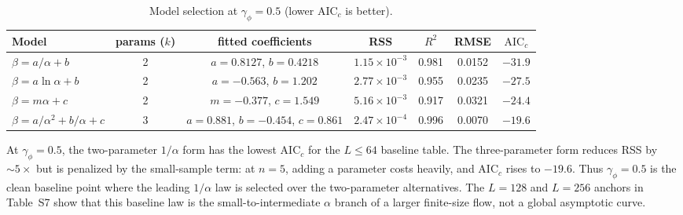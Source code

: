 \documentclass[aps,prb,twocolumn,superscriptaddress]{revtex4-2}
\begin{document}
\begin{table}[h]
\caption{Model selection at $\gamma_\phi = 0.5$ (lower $\text{AIC}_c$ is better).}
\label{tab:S1}
\begin{ruledtabular}
\begin{tabular}{lcccccc}
Model & params ($k$) & fitted coefficients & RSS & $R^2$ & RMSE & $\text{AIC}_c$ \\
\hline
$\beta = a/\alpha + b$ & 2 & $a=0.8127$, $b=0.4218$ & $1.15\times10^{-3}$ & 0.981 & 0.0152 & $\mathbf{-31.9}$ \\
$\beta = a\ln\alpha + b$ & 2 & $a=-0.563$, $b=1.202$ & $2.77\times10^{-3}$ & 0.955 & 0.0235 & $-27.5$ \\
$\beta = m\alpha + c$ & 2 & $m=-0.377$, $c=1.549$ & $5.16\times10^{-3}$ & 0.917 & 0.0321 & $-24.4$ \\
$\beta = a/\alpha^2 + b/\alpha + c$ & 3 & $a=0.881$, $b=-0.454$, $c=0.861$ & $2.47\times10^{-4}$ & 0.996 & 0.0070 & $-19.6$ \\
\end{tabular}
\end{ruledtabular}
\end{table}

At $\gamma_\phi = 0.5$, the two-parameter $1/\alpha$ form has the lowest $\text{AIC}_c$ for the $L\leq 64$ baseline table. The three-parameter form reduces RSS by $\sim 5\times$ but is penalized by the small-sample term: at $n = 5$, adding a parameter costs heavily, and $\text{AIC}_c$ rises to $-19.6$. Thus $\gamma_\phi = 0.5$ is the clean baseline point where the leading $1/\alpha$ law is selected over the two-parameter alternatives. The $L=128$ and $L=256$ anchors in Table~S7 show that this baseline law is the small-to-intermediate $\alpha$ branch of a larger finite-size flow, not a global asymptotic curve.
\end{document}
